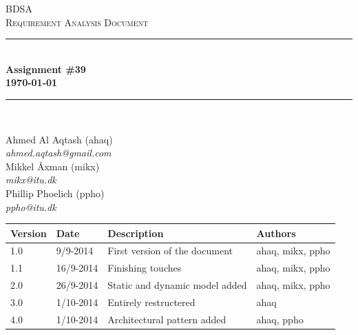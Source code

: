\documentclass[10pt]{report}
\numberwithin{equation}{section} %
\numberwithin{figure}{section} %
\numberwithin{table}{section} %
\newcommand{\HRule}{\rule{\linewidth}{0.5mm}}
\begin{document}
\begin{titlepage}

\begin{center}

\textsc{\LARGE BDSA}\\[1.5cm]

\textsc{\Large Requirement Analysis Document}\\[0.5cm]

\HRule \\[0.4cm]

{ \bfseries Assignment \#39 \\[0.5cm] 
    {\small \today}} \\[0.7cm]

\HRule \\ [6.5cm]

\begin{minipage}{0.5\textwidth}
\begin{flushleft} \large
Ahmed Al Aqtash (ahaq)\\
\textit{ahmed.aqtash@gmail.com}\\
Mikkel Åxman (mikx)\\
\textit{mikx@itu.dk}\\
Phillip Phoelich (ppho)\\
\textit{ppho@itu.dk}\\

\vfill 
\end{flushleft}
\end{minipage}

\end{center}

\end{titlepage}
\clearpage
\begin{table}[h]
\begin{tabularx}{\textwidth}{l l X l}
\textbf{Version} & \textbf{Date} & \textbf{Description} & \textbf{Authors} \\ \midrule
1.0     & 9/9-2014 & First version of the document & ahaq, mikx, ppho \\
1.1     & 16/9-2014& Finishing touches             & ahaq, mikx, ppho \\
2.0     & 26/9-2014& Static and dynamic model added & ahaq, mikx, ppho \\
3.0     & 1/10-2014 & Entirely restructered                    & ahaq\\
4.0     & 1/10-2014 & Architectural pattern added         & ahaq, ppho\\
\end{tabularx}
\end{table}
\end{document}
